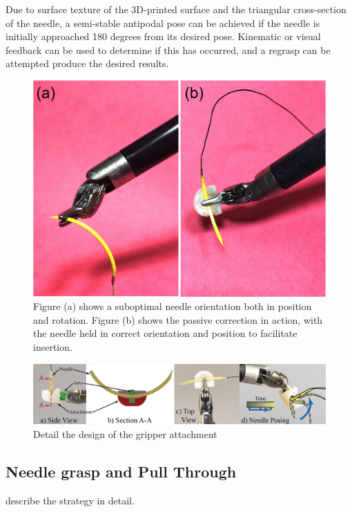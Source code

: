 Due to surface texture of the $3$D-printed surface and the triangular cross-section of the needle, a semi-stable antipodal pose can be achieved if the needle is initially approached 180 degrees from its desired pose. Kinematic or visual feedback can be used to determine if this has occurred, and a regrasp can be attempted produce the desired results.


\begin{figure}[t!]
\centering
\includegraphics[width=0.95\linewidth]{figures/gripperAttachment}
\caption{Figure (a) shows a suboptimal needle orientation both in position and rotation. Figure (b) shows the passive correction in action, with the needle held in correct orientation and position to facilitate insertion. }
\label{fig:jawMount}
\vspace{-10pt}
\end{figure}


\begin{figure}[!t]
\centering
\includegraphics[width=\linewidth]{figures/NeedleGripper2-01}
\caption{Detail the design of the gripper attachment}
\label{fig:gripper design}
\vspace{-10pt}
\end{figure}

\subsection{Needle grasp and Pull Through}
describe the strategy in detail. 